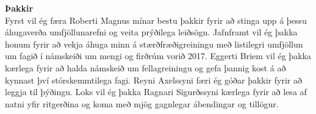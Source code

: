 \vspace*{36pt}
\thispagestyle{empty}
{\bf \noindent \huge Þakkir}\\

\noindent Fyrst vil ég færa Roberti Magnus mínar bestu þakkir fyrir að stinga upp á þessu áhugaverða umfjöllunarefni og veita prýðilega leiðsögn. Jafnframt vil ég þakka honum fyrir að vekja áhuga minn á stærðfræðigreiningu með listilegri umfjöllun um fagið í námskeiði um mengi og firðrúm vorið 2017. Eggerti Briem vil ég þakka kærlega fyrir að halda námskeið um fellagreiningu og gefa þannig kost á að kynnast því stórskemmtilega fagi. Reyni Axelssyni færi ég góðar þakkir fyrir að leggja til þýðingu. Loks vil ég þakka Ragnari Sigurðssyni kærlega fyrir að lesa af natni yfir ritgerðina og koma með mjög gagnlegar ábendingar og tillögur.